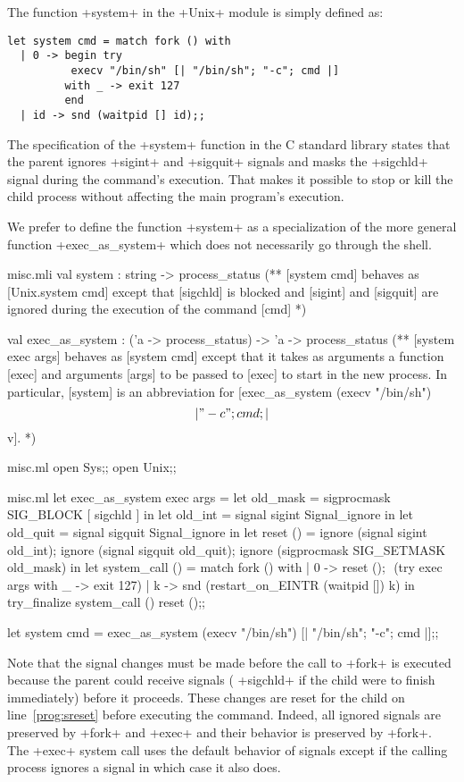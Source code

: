\begin{example}
The function \ml+system+ in the \ml+Unix+ module is simply defined as: 
%
\begin{lstlisting}
let system cmd = match fork () with
  | 0 -> begin try
          execv "/bin/sh" [| "/bin/sh"; "-c"; cmd |]
         with _ -> exit 127 
         end
  | id -> snd (waitpid [] id);;
\end{lstlisting}
% 
The specification of the \ml+system+ function in the C standard
library states that the parent ignores \ml+sigint+ and
\ml+sigquit+ signals and masks the \ml+sigchld+ signal during the
command's execution.  That makes it possible to stop or kill the child
process without affecting the main program's execution.

We prefer to define the function \ml+system+ as a specialization of the
more general function \ml+exec_as_system+ which does not necessarily 
go through the shell.
%
\begin{codefile}{misc.mli}
val system : string -> process_status
(** [system cmd] behaves as [Unix.system cmd] except that [sigchld] is
blocked and [sigint] and [sigquit] are ignored during the execution 
of the command [cmd] *)

val exec_as_system : ('a -> process_status) -> 'a -> process_status
(** [system exec args] behaves as [system cmd] except that it takes as
arguments a function [exec] and arguments [args] to be passed to [exec]
to start in the new process. In particular, [system] is an abbreviation for 
[exec_as_system (execv "/bin/sh") \[|"-c"; cmd; |\] v]. *)
\end{codefile}
%
\begin{codefile}{misc.ml}
open Sys;;
open Unix;;
\end{codefile}
%
\begin{listingcodefile}[style=numbers]{misc.ml}
let exec_as_system exec args = 
  let old_mask = sigprocmask SIG_BLOCK [ sigchld ] in 
  let old_int = signal sigint Signal_ignore in 
  let old_quit = signal sigquit Signal_ignore in 
  let reset () =
    ignore (signal sigint old_int); 
    ignore (signal sigquit old_quit);
    ignore (sigprocmask SIG_SETMASK old_mask) in
  let system_call () = match fork () with
    | 0 -> 
        reset (); $\label{prog:sreset}$
        (try exec args with _ -> exit 127)
    | k -> 
        snd (restart_on_EINTR (waitpid []) k) in
  try_finalize system_call () reset ();; $\label{prog:stry}$

let system cmd = 
  exec_as_system (execv "/bin/sh") [| "/bin/sh"; "-c"; cmd |];;
\end{listingcodefile}
%
Note that the signal changes must be made before the call
to \ml+fork+ is executed because the parent could receive signals
(\eg{} \ml+sigchld+ if the child were to finish immediately) before it
proceeds. These changes are reset for the child on line~\ref{prog:sreset}
before executing the command. Indeed, all ignored signals
are preserved by \ml+fork+ and \ml+exec+ and their behavior is
preserved by \ml+fork+.  The \ml+exec+ system call uses the
default behavior of signals except if the calling process ignores a
signal in which case it also does. 


\end{example}
